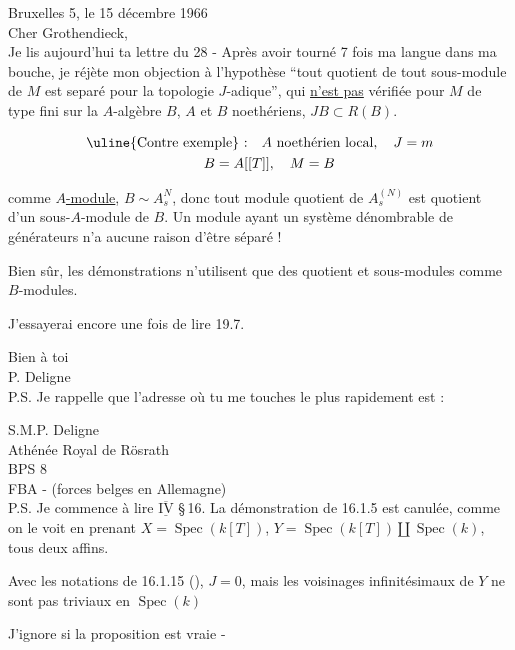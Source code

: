 
Bruxelles 5, le 15 décembre 1966\\

Cher Grothendieck,\\

Je lis aujourd'hui ta lettre du 28 - Après avoir tourné 7 fois ma langue dans ma bouche, je réjète mon objection à l'hypothèse ``tout quotient de tout sous-module de $M$ est separé pour la topologie $J$-adique'', qui \uline{n'est pas} vérifiée pour $M$ de type fini sur la $A$-algèbre $B$, $A$ et $B$ noethériens, $JB\subset R(B)$.

\[
\begin{aligned}
&\text{\uline{Contre exemple} :}\quad A\ \text{noethérien local},\quad J=m\\
&\hphantom{\text{Contre exemple :}\quad} B=A[[T]],\quad M=B
\end{aligned}
\]

comme \uline{$A$-module}, $B\sim A_s^N$, donc tout module quotient de $A_s^{(N)}$ est quotient d'un sous-$A$-module de $B$.  Un module ayant un système dénombrable de générateurs n'a aucune raison d'être séparé !

Bien sûr, les démonstrations  n'utilisent que des quotient et sous-modules comme $B$-modules.

J'essayerai encore une fois de lire 19.7.

Bien à toi\\

P. Deligne\\

P.S. Je rappelle que l'adresse où tu me touches le plus rapidement est :

S.M.\quad P. Deligne\\
Athénée Royal de Rösrath\\
BPS 8\\
FBA - (forces belges en Allemagne)\\

P.S. Je commence à lire $\overline{\underline{\mathrm{IV}}}$ \S\,16. La démonstration de 16.1.5 est canulée, comme on le voit en prenant $X=\operatorname{Spec}(k[T])$, $Y=\operatorname{Spec}(k[T])\amalg\operatorname{Spec}(k)$, tous deux affins.


Avec les notations de 16.1.15 (), $J=0$, mais les voisinages infinitésimaux de $Y$ ne sont pas  triviaux en $\operatorname{Spec}(k)$

J'ignore si la proposition est vraie -
